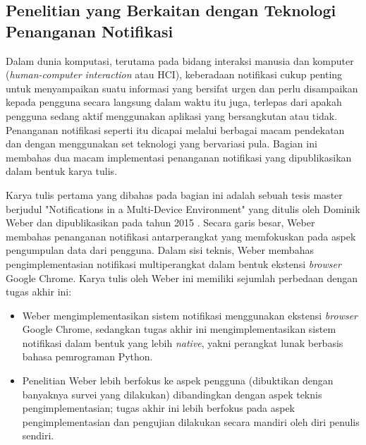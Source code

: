 \subsection{Penelitian yang Berkaitan dengan Teknologi Penanganan Notifikasi}

Dalam dunia komputasi, terutama pada bidang interaksi manusia dan komputer (\textit{human-computer interaction} atau HCI), keberadaan notifikasi cukup penting untuk menyampaikan suatu informasi yang bersifat urgen dan perlu disampaikan kepada pengguna secara langsung dalam waktu itu juga, terlepas dari apakah pengguna sedang aktif menggunakan aplikasi yang bersangkutan atau tidak. Penanganan notifikasi seperti itu dicapai melalui berbagai macam pendekatan dan dengan menggunakan set teknologi yang bervariasi pula. Bagian ini membahas dua macam implementasi penanganan notifikasi yang dipublikasikan dalam bentuk karya tulis.

Karya tulis pertama yang dibahas pada bagian ini adalah sebuah tesis master berjudul "Notifications in a Multi-Device Environment" yang ditulis oleh Dominik Weber dan dipublikasikan pada tahun 2015 \cite{weber2015notifications}. Secara garis besar, Weber membahas penanganan notifikasi antarperangkat yang memfokuskan pada aspek pengumpulan data dari pengguna. Dalam sisi teknis, Weber membahas pengimplementasian notifikasi multiperangkat dalam bentuk ekstensi \textit{browser} Google Chrome. Karya tulis oleh Weber ini memiliki sejumlah perbedaan dengan tugas akhir ini:
\begin{itemize}
    \item Weber mengimplementasikan sistem notifikasi menggunakan ekstensi \textit{browser} Google Chrome, sedangkan tugas akhir ini mengimplementasikan sistem notifikasi dalam bentuk yang lebih \textit{native}, yakni perangkat lunak berbasis bahasa pemrograman Python.

    \item Penelitian Weber lebih berfokus ke aspek pengguna (dibuktikan dengan banyaknya survei yang dilakukan) dibandingkan dengan aspek teknis pengimplementasian; tugas akhir ini lebih berfokus pada aspek pengimplementasian dan pengujian dilakukan secara mandiri oleh diri penulis sendiri.
\end{itemize}

